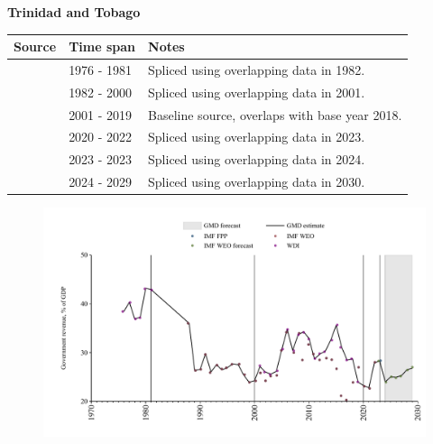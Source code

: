 \documentclass[12pt,a4paper,landscape]{article}
\begin{document}
\begin{adjustbox}{max totalsize={\paperwidth}{\paperheight},center}
\begin{minipage}[t][\textheight][t]{\textwidth}
\vspace*{0.5cm}
{}
\begin{center}
{\Large\bfseries Trinidad and Tobago}
\end{center}
\vspace{0.5cm}
\begin{table}[H]
\centering
\small
\begin{tabular}{|l|l|l|}
\hline
\textbf{Source} & \textbf{Time span} & \textbf{Notes} \\
\hline
\rowcolor{white}\cite{WDI}& 1976 - 1981 &Spliced using overlapping data in 1982.\\
\rowcolor{lightgray}\cite{IMF_WEO}& 1982 - 2000 &Spliced using overlapping data in 2001.\\
\rowcolor{white}\cite{WDI}& 2001 - 2019 &Baseline source, overlaps with base year 2018.\\
\rowcolor{lightgray}\cite{IMF_WEO}& 2020 - 2022 &Spliced using overlapping data in 2023.\\
\rowcolor{white}\cite{IMF_FPP}& 2023 - 2023 &Spliced using overlapping data in 2024.\\
\rowcolor{lightgray}\cite{IMF_WEO_forecast}& 2024 - 2029 &Spliced using overlapping data in 2030.\\
\hline
\end{tabular}
\end{table}
\begin{figure}[H]
\centering
\includegraphics[width=\textwidth,height=0.6\textheight,keepaspectratio]{graphs/TTO_govrev_GDP.pdf}
\end{figure}
\end{minipage}
\end{adjustbox}
\end{document}
